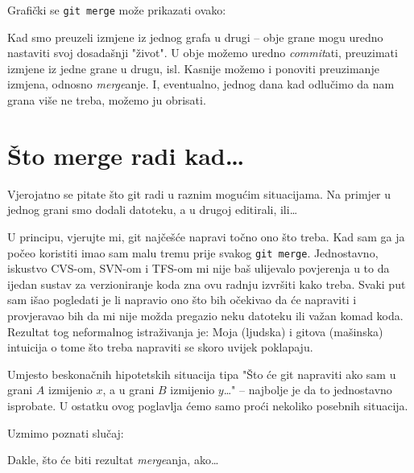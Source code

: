 Grafički se \verb+git merge+ može prikazati ovako:



Kad smo preuzeli izmjene iz jednog grafa u drugi -- obje grane mogu uredno nastaviti svoj dosadašnji "život".
U obje možemo uredno \emph{commit}ati, preuzimati izmjene iz jedne grane u drugu, isl.
Kasnije možemo i ponoviti preuzimanje izmjena, odnosno \emph{merge}anje.
I, eventualno, jednog dana kad odlučimo da nam grana više ne treba, možemo ju obrisati.





\section*{Što merge radi kad\dots}

Vjerojatno se pitate što git radi u raznim mogućim situacijama. Na primjer u jednog grani smo dodali datoteku, a u drugoj editirali, ili\dots

U principu, vjerujte mi, git najčešće napravi točno ono što treba. 
Kad sam ga ja počeo koristiti imao sam malu tremu prije svakog \verb+git merge+.
Jednostavno, iskustvo CVS-om, SVN-om i TFS-om mi nije baš ulijevalo povjerenja u to da ijedan sustav za verzioniranje koda zna ovu radnju izvršiti kako treba.
Svaki put sam išao pogledati je li napravio ono što bih očekivao da će napraviti i provjeravao bih da mi nije možda pregazio neku datoteku ili važan komad koda.
Rezultat tog neformalnog istraživanja je: Moja (ljudska) i gitova (mašinska) intuicija o tome što treba napraviti se skoro uvijek poklapaju.

Umjesto beskonačnih hipotetskih situacija tipa "Što će git napraviti ako sam u grani $A$ izmijenio $x$, a u grani $B$ izmijenio $y$\dots" -- najbolje je da to jednostavno isprobate. 
U ostatku ovog poglavlja ćemo samo proći nekoliko posebnih situacija.

Uzmimo poznati slučaj:



Dakle, što će biti rezultat \emph{merge}anja, ako\dots

